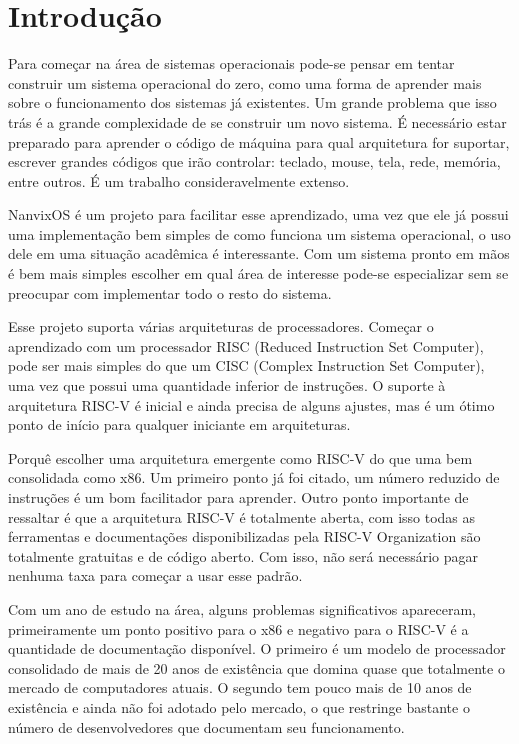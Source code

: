 \section{Introdução}


Para começar na área de sistemas operacionais pode-se pensar em tentar construir um sistema operacional do zero, 
como uma forma de aprender mais sobre o funcionamento dos sistemas já existentes. Um grande problema que isso 
trás é a grande complexidade de se construir um novo sistema. É necessário estar preparado para aprender o 
código de máquina para qual arquitetura for suportar, escrever grandes códigos que irão controlar: teclado, 
mouse, tela, rede, memória, entre outros. É um trabalho consideravelmente extenso.

NanvixOS é um projeto para facilitar esse aprendizado, uma vez que ele já possui uma implementação bem 
simples de como funciona um sistema operacional, o uso dele em uma situação acadêmica é interessante. Com 
um sistema pronto em mãos é bem mais simples escolher em qual área de interesse pode-se especializar sem se 
preocupar com implementar todo o resto do sistema.

Esse projeto suporta várias arquiteturas de processadores. Começar o aprendizado com um processador RISC 
(Reduced Instruction Set Computer), pode ser mais simples do que um CISC (Complex Instruction Set Computer), 
uma vez que possui uma quantidade inferior de instruções. O suporte à arquitetura RISC-V é inicial e ainda 
precisa de alguns ajustes, mas é um ótimo ponto de início para qualquer iniciante em arquiteturas.

Porquê escolher uma arquitetura emergente como RISC-V do que uma bem consolidada como x86. Um primeiro ponto 
já foi citado, um número reduzido de instruções é um bom facilitador para aprender. Outro ponto importante 
de ressaltar é que a arquitetura RISC-V é totalmente aberta, com isso todas as ferramentas e documentações 
disponibilizadas pela RISC-V Organization \cite{RISCV_Org} são totalmente gratuitas e de código aberto. 
Com isso, não será necessário pagar nenhuma taxa para começar a usar esse padrão.

Com um ano de estudo na área, alguns problemas significativos apareceram, primeiramente um ponto positivo 
para o x86 e negativo para o RISC-V é a quantidade de documentação disponível. O primeiro é um modelo de 
processador consolidado de mais de 20 anos de existência que domina quase que totalmente o mercado de 
computadores atuais. O segundo tem pouco mais de 10 anos de existência e ainda não foi adotado pelo 
mercado, o que restringe bastante o número de desenvolvedores que documentam seu funcionamento.

